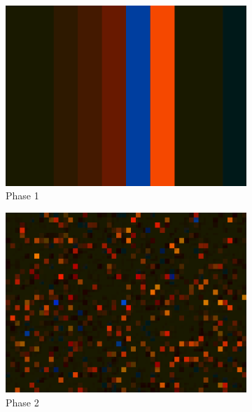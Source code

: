 \begin{figure}
\centering
\begin{subfigure}{.5\textwidth}
  \centering
  \includegraphics[width=.95\linewidth]{../study-2/results/visualisations/aesthetic-one.png}
  \caption{Phase 1}
  \label{fig:aesthetic-one}
\end{subfigure}%
\begin{subfigure}{.5\textwidth}
  \centering
  \includegraphics[width=.95\linewidth]{../study-2/results/visualisations/aesthetic-two.png}
  \caption{Phase 2}
  \label{fig:aesthetic-two}
\end{subfigure}\\
\begin{subfigure}{.5\textwidth}
  \centering

\end{subfigure}
\end{figure}
